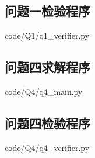 \documentclass[12pt,a4paper]{ctexart}
\begin{document}
\subsection{问题一检验程序}\label{app:q1verifier}

  {code/Q1/q1_verifier.py}

\subsection{问题四求解程序}\label{app:q4main}

  {code/Q4/q4_main.py}

\subsection{问题四检验程序}\label{app:q4verifier}

  {code/Q4/q4_verifier.py}
\end{document}
